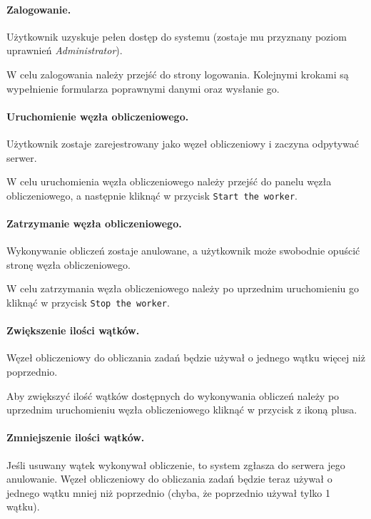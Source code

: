 \documentclass[a4paper,11pt,twoside]{report}
\theoremstyle{definition}
\begin{document}
        
            \paragraph{Zalogowanie.} 
                \noindent Użytkownik uzyskuje pełen dostęp do systemu (zostaje mu przyznany poziom uprawnień \textit{Administrator}). 
            
                W celu zalogowania należy przejść do strony logowania. Kolejnymi krokami są wypełnienie formularza poprawnymi danymi oraz wysłanie go.
                
            \paragraph{Uruchomienie węzła obliczeniowego.} 
                \noindent Użytkownik zostaje zarejestrowany jako węzeł obliczeniowy i zaczyna odpytywać serwer.
                
                W celu uruchomienia węzła obliczeniowego należy przejść do panelu węzła obliczeniowego, a następnie kliknąć w przycisk \texttt{Start the worker}. 
                
            \paragraph{Zatrzymanie węzła obliczeniowego.}  
                \noindent Wykonywanie obliczeń zostaje anulowane, a użytkownik może swobodnie opuścić stronę węzła obliczeniowego.
    
                W celu zatrzymania węzła obliczeniowego należy po uprzednim uruchomieniu go kliknąć w przycisk \texttt{Stop the worker}.
                
            \paragraph{Zwiększenie ilości wątków.}   
                \noindent Węzeł obliczeniowy do obliczania zadań będzie używał o jednego wątku więcej niż poprzednio. 

                Aby zwiększyć ilość wątków dostępnych do wykonywania obliczeń należy po uprzednim uruchomieniu węzła obliczeniowego kliknąć w przycisk z ikoną plusa.

            \paragraph{Zmniejszenie ilości wątków.}   
                \noindent Jeśli usuwany wątek wykonywał obliczenie, to system zgłasza do serwera jego anulowanie. Węzeł obliczeniowy do obliczania zadań będzie teraz używał o jednego wątku mniej niż poprzednio (chyba, że poprzednio używał tylko 1 wątku).
\end{document}
